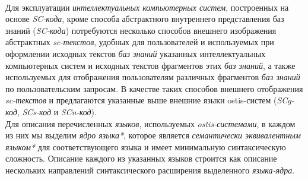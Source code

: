 \begin{SCn}
\begin{scnstruct}
{        \\Для эксплуатации \textit{интеллектуальных компьютерных систем}, построенных на основе \textit{SC-кода}, кроме способа абстрактного внутреннего представления баз знаний (\textit{SC-кода}) потребуются несколько способов внешнего изображения абстрактных \textit{sc-текстов}, удобных для пользователей и используемых при оформлении исходных текстов \textit{баз знаний} указанных интеллектуальных компьютерных систем и исходных текстов фрагментов этих \textit{баз знаний}, а также используемых для отображения пользователям различных фрагментов \textit{баз знаний} по пользовательским запросам. В качестве таких способов внешнего отображения \textit{sc-текстов} и предлагаются указанные выше внешние языки ostis-систем (\textit{SCg-код}, \textit{SCs-код} и  \textit{SCn-код}). 
        \\Для описания перечисленных \textit{языков}, используемых \textit{ostis-системами}, в каждом из них мы выделим \textit{ядро языка*}, которое является \textit{семантически эквивалентным языком*} для соответствующего языка и имеет минимальную синтаксическую сложность. Описание каждого из указанных языков строится как описание нескольких направлений синтаксического расширения выделенного \textit{языка-ядра}.}
        
       
        

\end{scnstruct}
\end{SCn}
